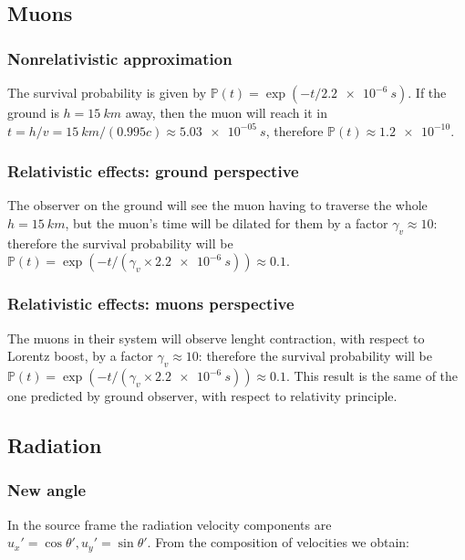 \documentclass[main.tex]{subfiles}
\begin{document}
\subsection{Muons}

\subsubsection{Nonrelativistic approximation}

The survival probability is given by \(\mathbb{P} (t) = \exp(-t/ \SI{2.2e-6}{s})\). If the ground is \( h =\SI{15}{km} \) away, then the muon will reach it in \(t = h/v = \SI{15}{km} / (0.995c) \approx \SI{5.03e-05}{s}\), therefore \(\mathbb{P}(t) \approx \num{1.2e-10} \).

\subsubsection{Relativistic effects: ground perspective}

The observer on the ground will see the muon having to traverse the whole \(h = \SI{15}{km} \), but the muon's time will be dilated for them by a factor \(\gamma_v \approx 10\): therefore the survival probability
will be \(\mathbb{P}(t) = \exp(- t / (\gamma_v \times \SI{2.2e-6}{s})) \approx 0.1\).


\subsubsection{Relativistic effects: muons perspective}

The muons in their system will observe lenght contraction, with respect to Lorentz boost, by a factor \(\gamma_v \approx 10\): therefore the survival probability
will be \(\mathbb{P}(t) = \exp(- t / (\gamma_v \times \SI{2.2e-6}{s})) \approx 0.1\). This result is the same of the one predicted by ground observer, with respect to relativity principle.


\subsection{Radiation}

\subsubsection{New angle}
In the source frame the radiation velocity components are \( u_x' = \cos\theta', u_y' = \sin\theta' \). From the composition of velocities we obtain:
\end{document}
